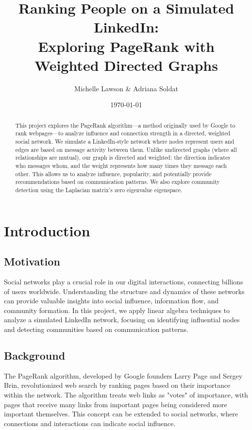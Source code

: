 \documentclass[12pt,letterpaper]{article}
\title{Ranking People on a Simulated LinkedIn:\\
Exploring PageRank with Weighted Directed Graphs}
\author{Michelle Lawson \& Adriana Soldat}
\date{\today}
\begin{document}
\maketitle

\begin{abstract}
    This project explores the PageRank algorithm—a method originally used by Google to rank webpages—to analyze influence and connection strength in a directed, weighted social network. We simulate a LinkedIn-style network where nodes represent users and edges are based on message activity between them. Unlike undirected graphs (where all relationships are mutual), our graph is directed and weighted: the direction indicates who messages whom, and the weight represents how many times they message each other. This allows us to analyze influence, popularity, and potentially provide recommendations based on communication patterns. We also explore community detection using the Laplacian matrix's zero eigenvalue eigenspace.
\end{abstract}

\section{Introduction}
\subsection{Motivation}
Social networks play a crucial role in our digital interactions, connecting billions of users worldwide. Understanding the structure and dynamics of these networks can provide valuable insights into social influence, information flow, and community formation. In this project, we apply linear algebra techniques to analyze a simulated LinkedIn network, focusing on identifying influential nodes and detecting communities based on communication patterns.

\subsection{Background}
The PageRank algorithm, developed by Google founders Larry Page and Sergey Brin, revolutionized web search by ranking pages based on their importance within the network. The algorithm treats web links as "votes" of importance, with pages that receive many links from important pages being considered more important themselves. This concept can be extended to social networks, where connections and interactions can indicate social influence.
\end{document}
